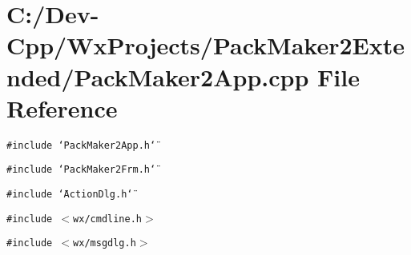 \section{C:/Dev-Cpp/Wx\-Projects/Pack\-Maker2Extended/Pack\-Maker2App.cpp File Reference}
\label{_pack_maker2_app_8cpp}
{\tt \#include \char`\"{}Pack\-Maker2App.h\char`\"{}}\par
{\tt \#include \char`\"{}Pack\-Maker2Frm.h\char`\"{}}\par
{\tt \#include \char`\"{}Action\-Dlg.h\char`\"{}}\par
{\tt \#include $<$wx/cmdline.h$>$}\par
{\tt \#include $<$wx/msgdlg.h$>$}\par
